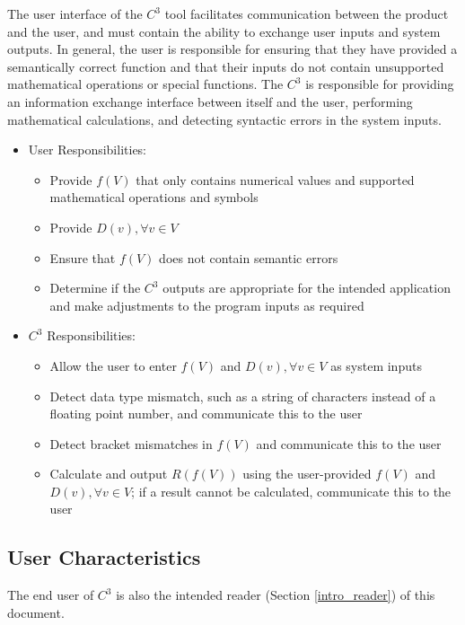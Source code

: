 \documentclass[12pt]{article}
\newcommand{\prognameAbbrv}{$C^{3}$}
\begin{document}
The user interface of the \prognameAbbrv{} tool facilitates communication 
between the product and the user, and must contain the ability to exchange user 
inputs and system outputs. In general, the user is responsible for ensuring 
that they have provided a semantically correct function and that their inputs 
do not contain unsupported mathematical operations or special functions. The 
\prognameAbbrv{} is responsible for providing an information exchange interface 
between itself and the user, performing mathematical calculations, and 
detecting syntactic errors in the system inputs.
\newpage
\begin{itemize}
	\item User Responsibilities:
	\begin{itemize}
		\item Provide $f(V)$ that only contains numerical values and supported 
		mathematical operations and symbols
		\item Provide $D(v), \forall v\in V$
		\item Ensure that $f(V)$ does not contain semantic errors
		\item Determine if the \prognameAbbrv{} outputs are appropriate for 
		the intended application and make adjustments to the program inputs as 
		required
	\end{itemize}

	\item \prognameAbbrv{} Responsibilities:
	\begin{itemize}
		\item Allow the user to enter $f(V)$ and $D(v), \forall v\in V$	as 
		system inputs
		\item Detect data type mismatch, such as a string of characters instead 
		of a floating point number, and communicate this to the user
		\item Detect bracket mismatches in $f(V)$ and communicate this to the 
		user
		\item Calculate and output $R(f(V))$ using the user-provided $f(V)$ and 
		$D(v), \forall v\in V$; if a result cannot be calculated, communicate 
		this to the user
	\end{itemize}
\end{itemize}

\subsection{User Characteristics} \label{SecUserCharacteristics}
The end user of \prognameAbbrv{} is also the intended reader (Section 
\ref{intro_reader}) of this document.
\end{document}
